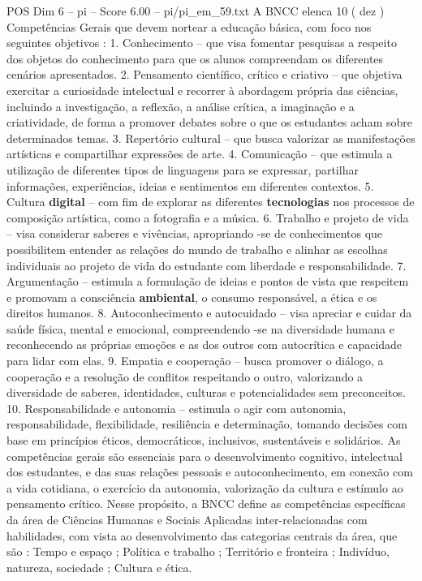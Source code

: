 \begin{textsample}{POS Dim 6 – pi – Score 6.00 – pi/pi\_em\_59.txt}
A BNCC elenca 10 ( dez ) Competências Gerais que devem nortear a educação básica, com foco nos seguintes objetivos : 1.
Conhecimento – que visa fomentar pesquisas a respeito dos objetos do conhecimento para que os alunos compreendam os diferentes cenários apresentados. 2.
Pensamento científico, crítico e criativo – que objetiva exercitar a curiosidade intelectual e recorrer à abordagem própria das ciências, incluindo a investigação, a reflexão, a análise crítica, a imaginação e a criatividade, de forma a promover debates sobre o que os estudantes acham sobre determinados temas. 3.
Repertório cultural – que busca valorizar as manifestações artísticas e compartilhar expressões de arte. 4.
Comunicação – que estimula a utilização de diferentes tipos de linguagens para se expressar, partilhar informações, experiências, ideias e sentimentos em diferentes contextos. 5.
Cultura \textbf{digital} – com fim de explorar as diferentes \textbf{tecnologias} nos processos de composição artística, como a fotografia e a música. 6.
Trabalho e projeto de vida – visa considerar saberes e vivências, apropriando -se de conhecimentos que possibilitem entender as relações do mundo de trabalho e alinhar as escolhas individuais ao projeto de vida do estudante com liberdade e responsabilidade. 7.
Argumentação – estimula a formulação de ideias e pontos de vista que respeitem e promovam a consciência \textbf{ambiental}, o consumo responsável, a ética e os direitos humanos. 8.
Autoconhecimento e autocuidado – visa apreciar e cuidar da saúde física, mental e emocional, compreendendo -se na diversidade humana e reconhecendo as próprias emoções e as dos outros com autocrítica e capacidade para lidar com elas. 9.
Empatia e cooperação – busca promover o diálogo, a cooperação e a resolução de conflitos respeitando o outro, valorizando a diversidade de saberes, identidades, culturas e potencialidades sem preconceitos. 10.
Responsabilidade e autonomia – estimula o agir com autonomia, responsabilidade, flexibilidade, resiliência e determinação, tomando decisões com base em princípios éticos, democráticos, inclusivos, sustentáveis e solidários.
As competências gerais são essenciais para o desenvolvimento cognitivo, intelectual dos estudantes, e das suas relações pessoais e autoconhecimento, em conexão com a vida cotidiana, o exercício da autonomia, valorização da cultura e estímulo ao pensamento crítico.
Nesse propósito, a BNCC define as competências específicas da área de Ciências Humanas e Sociais Aplicadas inter-relacionadas com habilidades, com vista ao desenvolvimento das categorias centrais da área, que são : Tempo e espaço ; Política e trabalho ; Território e fronteira ; Indivíduo, natureza, sociedade ; Cultura e ética.

\end{textsample}
